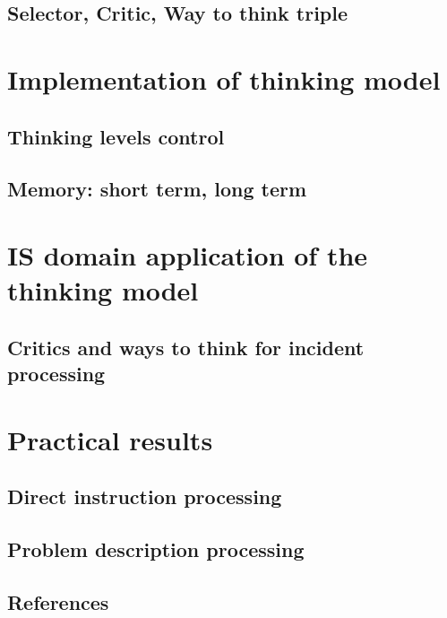 \documentclass{acm_proc_article-sp}
\begin{document}
\subsection{Selector, Critic, Way to think triple}

\section{Implementation of thinking model}
\subsection{Thinking levels control}
\subsection{Memory: short term, long term}


\section{IS domain application of the thinking model}
\subsection{Critics and ways to think for incident processing}

\section{Practical results}
\subsection{Direct instruction processing}
\subsection{Problem description processing}


\subsection{References}
\end{document}
